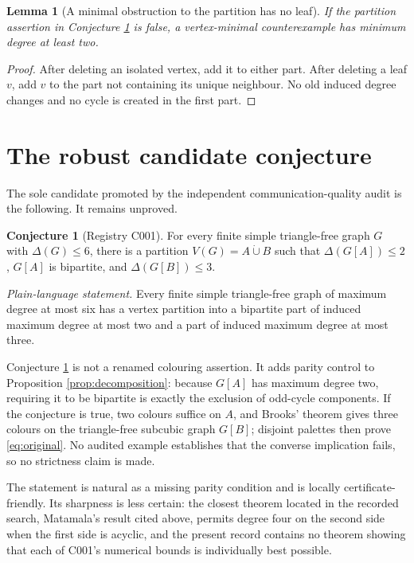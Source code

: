 \documentclass[11pt]{amsart}
\newtheorem{lemma}[proposition]{Lemma}
\theoremstyle{definition}
\newtheorem{conjecture}[proposition]{Conjecture}
\begin{document}
\begin{lemma}[A minimal obstruction to the partition has no leaf]
If the partition assertion in Conjecture \ref{conj:C001} is false, a
vertex-minimal counterexample has minimum degree at least two.
\end{lemma}

\begin{proof}
After deleting an isolated vertex, add it to either part.  After deleting a
leaf $v$, add $v$ to the part not containing its unique neighbour.  No old
induced degree changes and no cycle is created in the first part.
\end{proof}

\section{The robust candidate conjecture}

The sole candidate promoted by the independent communication-quality audit
is the following.  It remains unproved.

\begin{conjecture}[Registry C001]\label{conj:C001}
For every finite simple triangle-free graph \(G\) with \(\Delta(G)\le 6\), there is a partition \(V(G)=A\mathbin{\dot\cup}B\) such that \(\Delta(G[A])\le2\), \(G[A]\) is bipartite, and \(\Delta(G[B])\le3\).
\par\smallskip
{\raggedright\noindent\emph{Plain-language statement.} Every finite simple triangle-free graph of \mbox{maximum} degree at most six has a vertex partition into a bipartite part of \mbox{induced} \mbox{maximum} degree at most two and a part of \mbox{induced} \mbox{maximum} degree at most three.\par}
\end{conjecture}

Conjecture \ref{conj:C001} is not a renamed colouring assertion.  It adds
parity control to Proposition \ref{prop:decomposition}: because $G[A]$ has
maximum degree two, requiring it to be bipartite is exactly the exclusion of
odd-cycle components.  If the conjecture is true, two colours suffice on
$A$, and Brooks' theorem gives three colours on the triangle-free subcubic
graph $G[B]$; disjoint palettes then prove \eqref{eq:original}.  No audited
example establishes that the converse implication fails, so no strictness
claim is made.

The statement is natural as a missing parity condition and is locally
certificate-friendly.  Its sharpness is less certain: the closest theorem
located in the recorded search, Matamala's result cited above, permits degree
four on the second side when the first side is acyclic, and the present record
contains no theorem showing that each of C001's numerical bounds is
individually best possible.
\end{document}
